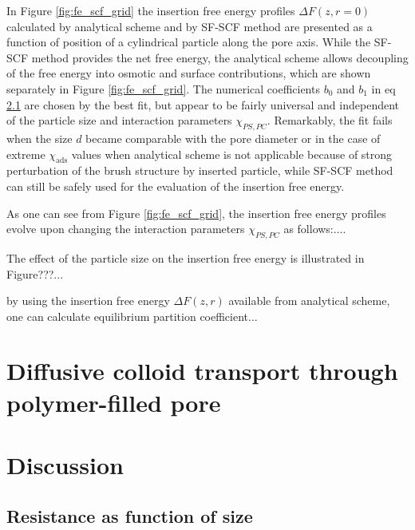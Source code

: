 \documentclass[12pt, a4paper]{article}
\newcommand\todo[1]{\textcolor{red}{#1}}
\begin{document}
In Figure \ref{fig:fe_scf_grid} the insertion free energy profiles $\Delta F(z,r=0)$ calculated by analytical scheme and by SF-SCF method are presented as a function of position of a cylindrical particle along the pore axis.
While the SF-SCF method provides the net free energy, the analytical scheme allows decoupling of the free energy into osmotic and surface contributions, which are shown separately in Figure \ref{fig:fe_scf_grid}.
The numerical coefficients $b_0$ and $b_1$ in eq \ref{} are chosen by the best fit, but appear to be fairly universal and independent of the particle size and interaction parameters $\chi_{PS,PC}$.
Remarkably, the fit fails when the size $d$ became comparable with the pore diameter or in the case of extreme $\chi_{\textrm{ads}}$ values when analytical scheme is not applicable because of strong perturbation 
of the brush structure by inserted particle, while SF-SCF method can still be safely used
for the evaluation of the insertion free energy.

As one can see from Figure \ref{fig:fe_scf_grid}, the insertion free energy profiles evolve upon changing the interaction parameters $\chi_{PS,PC}$ as follows:....

The effect of the particle size on the insertion free energy is illustrated in Figure???...

by using the insertion free energy $\Delta F(z,r)$ available from analytical scheme, one can calculate equilibrium partition coefficient...


\section{Diffusive colloid transport through polymer-filled pore}

% 

\section{Discussion}
\subsection{Resistance as function of size}
\end{document}

